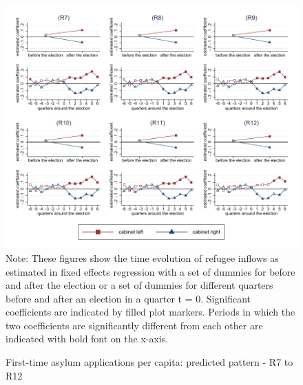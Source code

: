 \documentclass[11pt,a4paper]{scrartcl}
\begin{document}
\clearpage
\FloatBarrier


\clearpage
\FloatBarrier
\begin{figure}[!ht]
	\caption{First-time asylum applications per capita: predicted pattern - R7 to R12}
	\includegraphics[width=1\textwidth]{../results/applications/app_graphs_R7-R12.pdf}
	\scriptsize{Note: These figures show the time evolution of refugee inflows as estimated in fixed effects regression
		with a set of dummies for before and after the election or a set of dummies for different quarters before and after an election in a quarter t = 0. Significant coefficients are indicated by filled plot markers. Periods in which the two coefficients are significantly different from each other are indicated with bold font on the x-axis.}
\end{figure}

\clearpage
\FloatBarrier



\clearpage
\FloatBarrier


\clearpage
\FloatBarrier



\clearpage
\FloatBarrier

\end{document}
